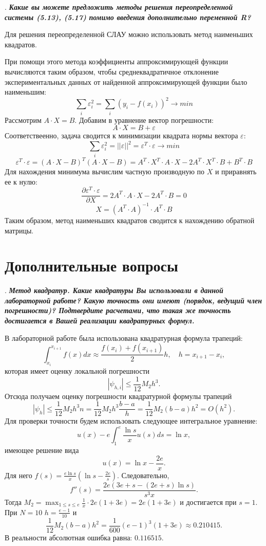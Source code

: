 \documentclass[12pt, a4paper]{article}
\newcounter{mycounter}
\newcommand{\question}[1]{%
	\stepcounter{mycounter}%
	\textbf{\themycounter}.  %
	\textbf{\textit{#1}}
	
}
\begin{document}
	\bigskip
	\question{Какие вы можете предложить методы решения переопределенной системы (5.13), (5.17) помимо введения дополнительно переменной R?}
	
		Для решения переопределенной СЛАУ можно использовать метод наименьших квадратов.
	
	При помощи этого метода коэффициенты аппроксимирующей функции вычисляются таким образом, чтобы среднеквадратичное отклонение экспериментальных данных от найденной аппроксимирующей функции было наименьшим:
	\[
	\sum_{i} \varepsilon_i^2 = \sum_{i} (y_i - f(x_i))^2 \rightarrow min
	\]
	Рассмотрим $A \cdot X = B$. Добавим в уравнение вектор погрешности:
	\[
	A \cdot X = B + \varepsilon
	\]
	Соответствеенно, задача сводится к минимизации квадрата нормы вектора $\varepsilon$:
	\[
	\sum_{i} \varepsilon_i^2 = || \varepsilon ||^2 = \varepsilon^T \cdot \varepsilon \rightarrow min
	\]
	\[
	\varepsilon^T \cdot \varepsilon = (A \cdot X - B)^T (A \cdot X - B) = A^T \cdot X^T \cdot A \cdot X - 2 A^T \cdot X^T \cdot B + B^T \cdot B
	\]
	Для нахождения минимума вычислим частную производную по $X$ и приравнять ее к нулю:
	\[
	\frac{\partial \varepsilon^T \cdot \varepsilon}{\partial X} = 2 A^T \cdot A \cdot X - 2 A^T \cdot B = 0
	\]
	\[
	X = (A^T \cdot A)^{-1} \cdot A^T \cdot B
	\]
	Таким образом, метод наименьших квадратов сводится к нахождению обратной матрицы.

	
	\clearpage
	\section{Дополнительные вопросы}
	
	\question{Метод квадратур. Какие квадратуры Вы использовали в данной лабораторной работе? Какую точность они имеют (порядок, ведущий член погрешности)? Подтвердите расчетами, что такая же точность достигается в Вашей реализации квадратурных формул.}
	
	
	В лабораторной работе была использована квадратурная формула трапеций:
	\[
	\int_{x_i}^{x_{i+1}} f(x) dx \approx \frac{f(x_i) + f(x_{i+1})}{2} h, \quad h = x_{i+1} - x_i,
	\]
	которая имеет оценку локальной погрешности
	\[
	|\psi_{h,i}| \le \frac{1}{12} M_2 h^3.
	\]
	Отсюда получаем оценку погрешности квадратурной формулы трапеций
	\[
	|\psi_h| \le \frac{1}{12} M_2 h^3 n = \frac{1}{12} M_2 h^3 \frac{b - a}{h} = \frac{1}{12} M_2 (b - a) h^2 = O(h^2).
	\]
	Для проверки точности будем использовать следующее интегральное уравнение:
	\[
	u(x) - e \int_1^e \frac{\ln s}{x} u(s) ds = \ln x,
	\]
	имеющее решение вида
	\[
	u(x) = \ln x - \frac{2e}{x}.
	\]
	Для него $f(s) = \frac{e \ln s}{x} \left( \ln s - \frac{2e}{s} \right)$. Следовательно,
	\[
	f''(s) = \frac{2e (3e + s - (2e + s) \ln s)}{s^3 x}.
	\]
	Тогда $M_2 = \max_{1 \le s \le e} \frac{1}{x} \cdot 2e (1 + 3e) = 2e (1 + 3e)$ и достигается при $s = 1$. При $N = 10$ $h = \frac{e - 1}{10}$ и
	\[
	\frac{1}{12} M_2 (b - a) h^2 = \frac{1}{600} (e - 1)^3 (1 + 3e) \approx 0.210415.
	\]
	В реальности абсолютная ошибка равна: $0.116515$.
	
\end{document}
